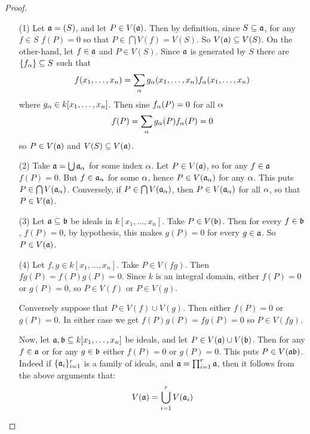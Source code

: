 \begin{proof}
  \begin{enumerate}
    \item[(1)] Let $\af=(S)$, and let $P \in V(\af)$. Then by
      definition, since $S \subseteq \af$, for any $f \in S$ $f(P)=0$
      so that $P \in \bigcap{V(f)}=V(S)$. So $V(\af) \subseteq V(S)$.
      On the other-hand, let $f \in \af$ and $P \in V(S)$. Since $\af$
      is generated by $S$ there are $\{f_\a\} \subseteq S$ such that
      \begin{equation*}
        f(x_1, \dots, x_n)=\sum_{\a}{g_\a(x_1, \dots, x_n)f_\a(x_1,
        \dots, x_n)}
      \end{equation*}
      where $g_\a \in k[x_1, \dots, x_n]$. Then sine $f_\a(P)=0$ for
      all $\a$
      \begin{equation*}
        f(P)=\sum_{\a}{g_\a(P)f_\a(P)}=0
      \end{equation*}
      so $P \in V(\af)$ and $V(S) \subseteq V(\af)$.

    \item[(2)] Take $\af=\bigcup{\af_\a}$ for some index $\a$. Let $P
      \in V(\af)$, so for any $f \in \af$ $f(P)=0$. But $f \in \af_\a$
      for some $\a$, hence $P \in V(\af_\a)$ for any $\a$. This puts
      $P  \in \bigcap{V(\af_\a)}$. Conversely, if $P \in
      \bigcap{V(\af_\a)}$, then $P \in V(\af_\a)$ for all $\a$, so
      that $P \in V(\af)$.

    \item[(3)] Let $\af \subseteq \bf$ be ideals in $k[x_1, \dots,
      x_n]$. Take $P \in V(\bf)$. Then for every $f \in \bf$,
      $f(P)=0$, by hypothesis, this makes $g(P)=0$ for every $g \in
      \af$. So $P \in V(\af)$.

    \item[(4)] Let $f,g \in k[x_1, \dots, x_n]$. Take $P \in V(fg)$.
      Then $fg(P)=f(P)g(P)=0$. Since $k$ is an integral domain, either
      $f(P)=0$ or $g(P)=0$, so $P \in V(f)$ or $P \in V(g)$.

      Conversely suppose that $P  \in V(f) \cup V(g)$. Then either
      $f(P)=0$ or $g(P)=0$. In either case we get $f(P)g(P)=fg(P)=0$
      so $P \in V(fg)$.

      Now, let $\af, \bf \subseteq k[x_1, \dots, x_n]$ be ideals, and
      let $P \in V(\af) \cup V(\bf)$. Then for any $f \in \af$ or for
      any $g \in \bf$ either $f(P)=0$ or $g(P)=0$. This puts $P \in
      V(\af\bf)$. Indeed if $\{\af_i\}_{i=1}^r$ is a family of ideals,
      and $\af=\prod_{i=1}^r{\af}$, then it follows from the above
      arguments that:
      \begin{equation*}
        V(\af)=\bigcup_{i=1}^r{V(\af_i)}
      \end{equation*}


\end{enumerate}
\end{proof}
